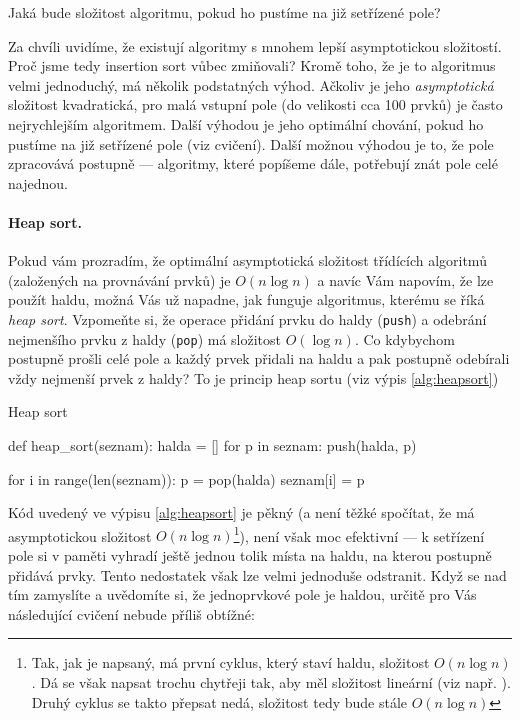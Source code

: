 \begin{cviceni} Jaká bude složitost algoritmu, pokud ho pustíme na již setřízené pole?
\end{cviceni}

Za chvíli uvidíme, že existují algoritmy s mnohem lepší asymptotickou složitostí. Proč jsme tedy insertion sort vůbec zmiňovali? Kromě toho, že
je to algoritmus velmi jednoduchý, má několik podstatných výhod. Ačkoliv je jeho \emph{asymptotická} složitost kvadratická, pro malá vstupní pole
(do velikosti cca 100 prvků) je často nejrychlejším algoritmem. Další výhodou je jeho optimální chování, pokud ho pustíme na již setřízené pole
(viz cvičení). Další možnou výhodou je to, že pole zpracovává postupně --- algoritmy, které popíšeme dále, potřebují znát pole celé najednou.

\paragraph{Heap sort.} Pokud vám prozradím, že optimální asymptotická složitost třídících algoritmů (založených na provnávání prvků) je $O(n\log n)$
a navíc Vám napovím, že lze použít haldu, možná Vás už napadne, jak funguje algoritmus, kterému se říká \emph{heap sort}. Vzpomeňte si, že
operace přidání prvku do haldy ({\tt push}) a odebrání nejmenšího prvku z haldy ({\tt pop}) má složitost $O(\log n)$. Co kdybychom postupně 
prošli celé pole a každý prvek přidali na haldu a pak postupně odebírali vždy nejmenší prvek z haldy? To je princip heap sortu (viz výpis \ref{alg:heapsort})

\begin{program}\caption{Heap sort}\label{alg:heapsort}
\begin{python}
def heap_sort(seznam):
  halda = []
  for p in seznam:
    push(halda, p)
  
  for i in range(len(seznam)):
    p = pop(halda)
    seznam[i] = p
\end{python}
\end{program}

Kód uvedený ve výpisu \ref{alg:heapsort} je pěkný (a není těžké spočítat, že má asymptotickou složitost $O(n\log n)$\footnote{Tak, jak je napsaný, má první cyklus, který staví haldu, 
složitost $O(n\log n)$. Dá se však napsat trochu chytřeji tak, aby měl složitost lineární (viz např. \cite{Wirth:1985}). Druhý cyklus se takto 
přepsat nedá, složitost tedy bude stále $O(n\log n)$}), není však moc efektivní --- k setřízení pole si
v paměti vyhradí ještě jednou tolik místa na haldu, na kterou postupně přidává prvky. Tento nedostatek však lze velmi jednoduše odstranit.
Když se nad tím zamyslíte a uvědomíte si, že jednoprvkové pole je haldou, určitě pro Vás následující cvičení nebude příliš obtížné:

